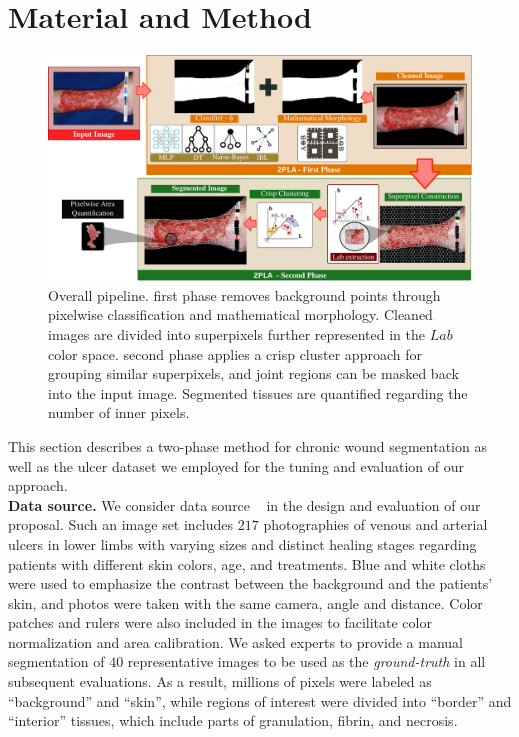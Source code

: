 \section{Material and Method}

\begin{figure}[!htb]
\centering
\includegraphics[scale=.66]{figs/pipeline2.pdf}
\caption{Overall \system pipeline.
\system first phase removes background points through pixelwise classification and mathematical morphology.
Cleaned images are divided into superpixels further represented in the $Lab$ color space.
\system second phase applies a crisp cluster approach for grouping similar superpixels, and joint regions can be masked back into the input image. 
Segmented tissues are quantified regarding the number of inner pixels.}
\label{fig:system}
\end{figure}
This section describes a two-phase method for chronic wound segmentation as well as the ulcer dataset we employed for the tuning and evaluation of our approach.\\

\noindent
\textbf{Data source.} 
We consider data source \dataset~\cite{Pereyra2014} in the design and evaluation of our proposal.
Such an image set includes $217$ photographies of venous and arterial ulcers in lower limbs with varying sizes and distinct healing stages regarding patients with different skin colors, age, and treatments.
Blue and white cloths were used to emphasize the contrast between the background and the patients' skin, and photos were taken with the same camera, angle and distance.
Color patches and rulers were also included in the images to facilitate color normalization and area calibration.
We asked experts to provide a manual segmentation of $40$ representative \dataset images to be used as the \textit{ground-truth} in all subsequent evaluations.
As a result, millions of pixels were labeled as ``background'' and ``skin'', while regions of interest were divided into ``border'' and ``interior'' tissues, which include parts of granulation, fibrin, and necrosis.\\


